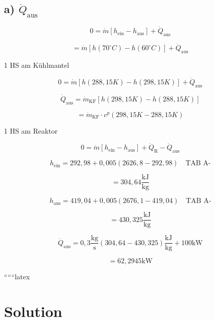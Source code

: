 \subsection*{a) $\dot{Q}_{\text{aus}}$}

\[
0 = \dot{m} \left[ h_{\text{ein}} - h_{\text{aus}} \right] + \dot{Q}_{\text{aus}}
\]

\[
= \dot{m} \left[ h(70^\circ C) - h(60^\circ C) \right] + \dot{Q}_{\text{aus}}
\]

1 HS am Kühlmantel

\[
0 = \dot{m} \left[ h(288,15K) - h(298,15K) \right] + \dot{Q}_{\text{aus}}
\]

\[
\dot{Q}_{\text{aus}} = \dot{m}_{\text{KF}} \left[ h(298,15K) - h(288,15K) \right]
\]

\[
= \dot{m}_{\text{KF}} \cdot c^p \left( 298,15K - 288,15K \right)
\]

1 HS am Reaktor

\[
0 = \dot{m} \left[ h_{\text{ein}} - h_{\text{aus}} \right] + \dot{Q}_{\text{R}} - \dot{Q}_{\text{aus}}
\]

\[
h_{\text{ein}} = 292,98 + 0,005 \left( 2626,8 - 292,98 \right) \quad \text{TAB A-}
\]

\[
= 304,64 \frac{\text{kJ}}{\text{kg}}
\]

\[
h_{\text{aus}} = 419,04 + 0,005 \left( 2676,1 - 419,04 \right) \quad \text{TAB A-}
\]

\[
= 430,325 \frac{\text{kJ}}{\text{kg}}
\]

\[
\dot{Q}_{\text{aus}} = 0,3 \frac{\text{kg}}{\text{s}} \left( 304,64 - 430,325 \right) \frac{\text{kJ}}{\text{kg}} + 100 \text{kW}
\]

\[
= 62,2945 \text{kW}
\]

``````latex

\section*{Solution}
